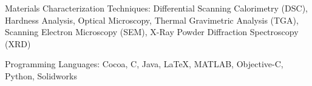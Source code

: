 \documentclass[10pt,letterpaper]{article}
\newenvironment{indentsection}[1]%
{\begin{list}{}%
  {\setlength{\leftmargin}{#1}}%
  \item[]%
}
{\end{list}}
\newcommand{\CPP}
{C\nolinebreak[4]\hspace{-.05em}\raisebox{.22ex}{\footnotesize\bf ++}}
\begin{document}
\begin{indentsection}{\parindent}
\begin{description*}
  \item[Materials Characterization Techniques:]
  Differential Scanning Calorimetry (DSC), Hardness Analysis, Optical Microscopy, Thermal Gravimetric Analysis (TGA), Scanning Electron Microscopy (SEM), X-Ray Powder Diffraction Spectroscopy (XRD)
  \item[Programming Languages:]
  Cocoa, \CPP, Java, \LaTeX, MATLAB, Objective-C, Python, Solidworks

\end{description*}
\end{indentsection}
\end{document}
